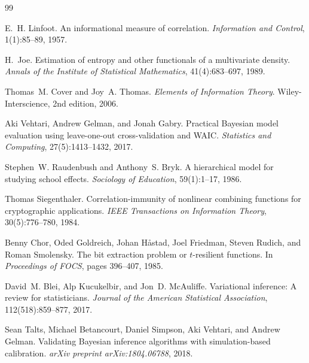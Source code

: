 \documentclass[10pt]{article} %
\theoremstyle{plain}
\theoremstyle{definition}
\begin{document}
\small
\begin{thebibliography}{99}

E.~H. Linfoot.
\newblock An informational measure of correlation.
\newblock \emph{Information and Control}, 1(1):85--89, 1957.

H.~Joe.
\newblock Estimation of entropy and other functionals of a multivariate density.
\newblock \emph{Annals of the Institute of Statistical Mathematics}, 41(4):683--697, 1989.

Thomas~M. Cover and Joy~A. Thomas.
\newblock \emph{Elements of Information Theory}.
\newblock Wiley-Interscience, 2nd edition, 2006.

Aki Vehtari, Andrew Gelman, and Jonah Gabry.
\newblock Practical {Bayesian} model evaluation using leave-one-out cross-validation and {WAIC}.
\newblock \emph{Statistics and Computing}, 27(5):1413--1432, 2017.

Stephen~W. Raudenbush and Anthony~S. Bryk.
\newblock A hierarchical model for studying school effects.
\newblock \emph{Sociology of Education}, 59(1):1--17, 1986.

Thomas Siegenthaler.
\newblock Correlation-immunity of nonlinear combining functions for cryptographic applications.
\newblock \emph{IEEE Transactions on Information Theory}, 30(5):776--780, 1984.

Benny Chor, Oded Goldreich, Johan H{\aa}stad, Joel Friedman, Steven Rudich, and Roman Smolensky.
\newblock The bit extraction problem or $t$-resilient functions.
\newblock In \emph{Proceedings of FOCS}, pages 396--407, 1985.

David~M. Blei, Alp Kucukelbir, and Jon~D. McAuliffe.
\newblock Variational inference: A review for statisticians.
\newblock \emph{Journal of the American Statistical Association}, 112(518):859--877, 2017.

Sean Talts, Michael Betancourt, Daniel Simpson, Aki Vehtari, and Andrew Gelman.
\newblock Validating {Bayesian} inference algorithms with simulation-based calibration.
\newblock \emph{arXiv preprint arXiv:1804.06788}, 2018.


\end{thebibliography}
\end{document}
